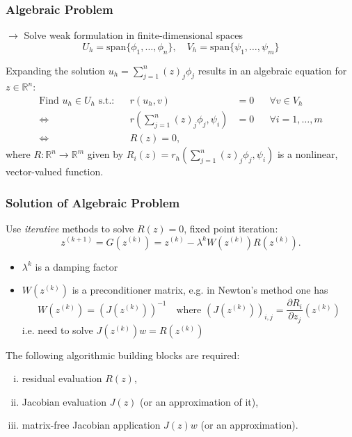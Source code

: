 \documentclass[ignorenonframetext,11pt]{beamer}
\theoremstyle{definition}
\begin{document}
\begin{frame}
\frametitle{Algebraic Problem}
$\to$ Solve weak formulation in finite-dimensional spaces
\begin{equation*}
U_h=\text{span}\{\phi_1,\ldots,\phi_n\}, \quad V_h=\text{span}\{\psi_1,\ldots,\psi_m\}
\end{equation*}

Expanding the solution $u_h=\sum_{j=1}^n (z)_j\phi_j$
results in an algebraic equation for $z\in\mathbb{R}^n$:
\begin{align*}
\text{Find $u_h\in U_h$ s.t.:} && r(u_h,v)&=0 && \forall v\in V_h\\
\Leftrightarrow{} && r\left(\sum_{j=1}^n (z)_j\phi_j,\psi_i\right) &= 0 &&\forall i=1,\ldots,m\\
\Leftrightarrow{} && R(z) = 0,
\end{align*}
where $R: \mathbb{R}^n \to \mathbb{R}^m$ given by
$R_i(z) = r_h\left(\sum_{j=1}^n (z)_j\phi_j,\psi_i\right)$ is a nonlinear, vector-valued function.
\end{frame}

\begin{frame}
\frametitle{Solution of Algebraic Problem}
Use {\em iterative} methods to solve $R(z)=0$, fixed point iteration:
\begin{equation}
z^{(k+1)} = G(z^{(k)}) = z^{(k)} - \lambda^{k} W(z^{(k)}) R(z^{(k)}) .
\end{equation}
\vspace{-5mm}
\begin{itemize}
\item $\lambda^{k}$ is a damping factor
\item $W(z^{(k)})$ is a preconditioner matrix, e.g. in Newton's method one has
\begin{equation*}
W(z^{(k)}) = (J(z^{(k)}))^{-1} \quad \text{where $(J(z^{(k)}))_{i,j} = \frac{\partial R_i}{\partial z_j}
(z^{(k)})$}
\end{equation*}
i.e. need to solve $J\left(z^{(k)}\right) w = R(z^{(k)})$
\end{itemize}
The following algorithmic building blocks are required:
\begin{enumerate}[i)]
\item residual evaluation $R(z)$,
\item Jacobian evaluation $J(z)$ (or an approximation of it),
\item matrix-free Jacobian application $J(z) w$ (or an approximation).
\end{enumerate}
\end{frame}
\end{document}
